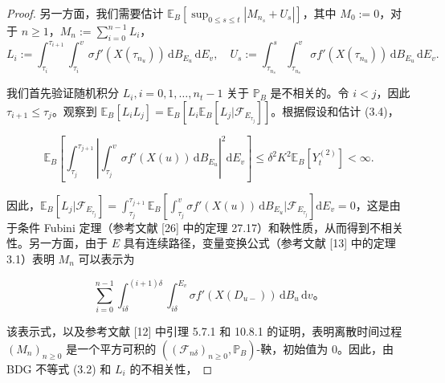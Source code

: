 \begin{proof}
	另一方面，我们需要估计 $\mathbb{E}_B \left[\sup_{0 \leq s \leq t} |M_{n_s} + U_s|\right]$，其中 $M_0 := 0$，对于 $n \geq 1$，$M_n := \sum_{i=0}^{n-1} L_i$，
	$$
	L_i := \int_{\tau_i}^{\tau_{i+1}} \int_{\tau_i}^{v} \sigma f'(X(\tau_{n_{u}})) \, \mathrm{d}B_{E_{u}} \, \mathrm{d}E_{v}, \quad U_s := \int_{\tau_{n_s}}^s \int_{\tau_{n_s}}^{v} \sigma f'(X(\tau_{n_{u}})) \, \mathrm{d}B_{E_{u}} \, \mathrm{d}E_{v}.
	$$
	
	我们首先验证随机积分 $L_i, i=0,1,\ldots,n_t-1$ 关于 $\mathbb{P}_B$ 是不相关的。令 $i < j$，因此 $\tau_{i+1} \leq \tau_j$。观察到 $\mathbb{E}_B [L_i L_j] = \mathbb{E}_B \left[L_i \mathbb{E}_B [L_j | \mathcal{F}_{E_{\tau_j}}]\right]$。根据假设和估计 (3.4)，
	
	$$
	\mathbb{E}_B \left[\int_{\tau_j}^{\tau_{j+1}} \left|\int_{\tau_j}^{v} \sigma f'(X(u))\, \mathrm{d}B_{E_{u}}\right|^2 \mathrm{d}E_{v}\right] \leq \delta^2 K^2 \mathbb{E}_B [Y_t^{(2)}] < \infty.
	$$
	
	因此，$\mathbb{E}_B \left[L_j | \mathcal{F}_{E_{\tau_j}}\right] = \int_{\tau_j}^{\tau_{j+1}} \mathbb{E}_B \left[\int_{\tau_j}^{v} \sigma f'(X(u))  \, \mathrm{d}B_{E_{u}} | \mathcal{F}_{E_{\tau_j}}\right] \mathrm{d}E_{v} = 0$，这是由于条件 Fubini 定理（参考文献 [26] 中的定理 27.17）和鞅性质，从而得到不相关性。另一方面，由于 $E$ 具有连续路径，变量变换公式（参考文献 [13] 中的定理 3.1）表明 $M_n$ 可以表示为
	
	$$
	\sum_{i=0}^{n-1} \int_{i\delta}^{(i+1)\delta} \int_{i\delta}^{E_{v}} \sigma f'(X(D_{u-})) \, \mathrm{d}B_{u} \, \mathrm{d}v。
	$$
	
	该表示式，以及参考文献 [12] 中引理 5.7.1 和 10.8.1 的证明，表明离散时间过程 $(M_n)_{n \geq 0}$ 是一个平方可积的 $((\mathcal{F}_{n\delta})_{n \geq 0}, \mathbb{P}_B)$-鞅，初始值为 0。因此，由 BDG 不等式 (3.2) 和 $L_i$ 的不相关性，
	

\end{proof}
